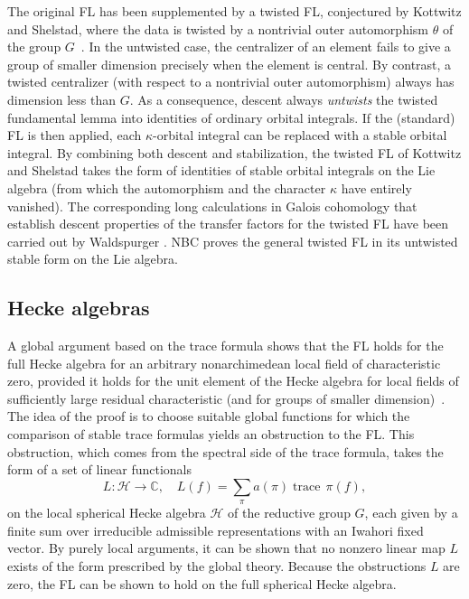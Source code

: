 \documentclass[brochure,english,12pt]{bourbaki}
\def\op#1{{\operatorname{#1}}}
\newcommand{\ring}[1]{\mathbb{#1}}
\begin{document}
The original FL has been supplemented by a twisted
FL, conjectured by Kottwitz and Shelstad, where the
data is twisted by a nontrivial outer automorphism $\theta$ of the
group $G$~\cite{KS:1999}.  In the untwisted case, the centralizer of an element fails
to give a group of smaller dimension precisely when the element is
central.  By contrast, a twisted centralizer (with respect to a
nontrivial outer automorphism) always has dimension less than $G$.  As
a consequence, descent always {\it untwists} the twisted fundamental
lemma into identities of ordinary orbital integrals.  If the
(standard) FL is then applied, each $\kappa$-orbital
integral can be replaced with a stable orbital integral.  By combining both
descent and stabilization, the twisted FL of Kottwitz and Shelstad
takes the form of identities of stable orbital integrals on the Lie
algebra (from which the automorphism and the character $\kappa$ have
entirely vanished).  The corresponding long calculations in Galois
cohomology that establish descent properties of the transfer factors
for the twisted FL have been carried out by
Waldspurger \cite{Wald:2008}.  NBC proves the general twisted FL in
its untwisted stable form on the Lie algebra.



\subsection{Hecke algebras}

 A global argument based on
the trace formula shows that the FL holds for the full
Hecke algebra for an arbitrary nonarchimedean local field of
characteristic zero, provided it holds for the unit element of the
Hecke algebra for local fields of sufficiently large residual
characteristic (and for groups of smaller dimension)~\cite{FLSE}.  
The idea of the proof is to choose suitable global
functions for which the comparison of stable trace formulas yields an
obstruction to the FL.  This obstruction, which comes from the
spectral side of the trace formula, takes the form
of a set of linear functionals  
\[
L:{\mathcal H}\to\ring{C},\quad L(f) = \sum_\pi a(\pi) \op{trace}\,\pi(f),
\]
on the local spherical Hecke
algebra ${\mathcal H}$ of the reductive group $G$, each given by a finite sum over
irreducible admissible representations with an Iwahori fixed vector.
By purely local arguments, it
can be shown that no nonzero linear map $L$ exists of the form
prescribed by the global theory.  
Because the obstructions $L$ are zero,
the FL can be shown to hold on the full spherical Hecke algebra.
\end{document}
